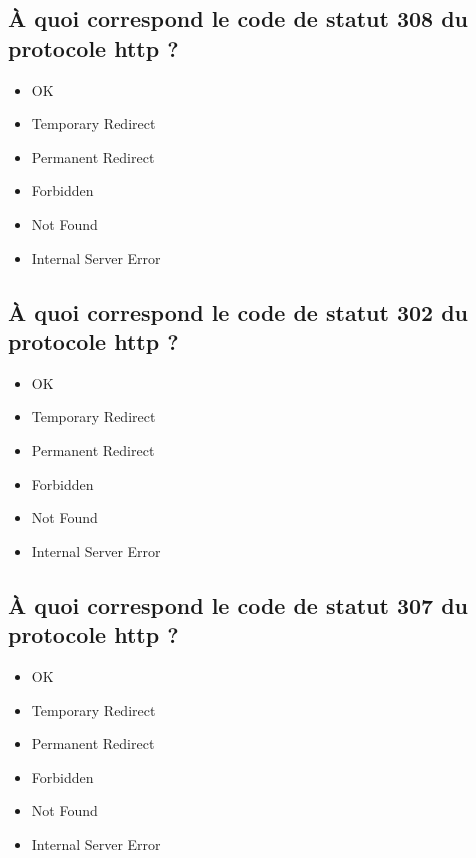 \documentclass[11pt,a4paper]{article}
\begin{document}
\subsection{\`A quoi correspond le code de statut 308 du protocole http ?} %

\begin{itemize}
\item[\CaseCoche] OK\\
\item[\CaseCoche] Temporary Redirect\\  %
\item[\CaseCoche] Permanent Redirect\\
\item[\CaseCoche] Forbidden\\
\item[\CaseCoche] Not Found\\
\item[\CaseCoche] Internal Server Error\\
\end{itemize}

\subsection{\`A quoi correspond le code de statut 302 du protocole http ?} %

\begin{itemize}
\item[\CaseCoche] OK\\
\item[\CaseCoche] Temporary Redirect\\
\item[\CaseCoche] Permanent Redirect\\  %
\item[\CaseCoche] Forbidden\\
\item[\CaseCoche] Not Found\\
\item[\CaseCoche] Internal Server Error\\
\end{itemize}


\subsection{\`A quoi correspond le code de statut 307 du protocole http ?} %

\begin{itemize}
\item[\CaseCoche] OK\\
\item[\CaseCoche] Temporary Redirect\\
\item[\CaseCoche] Permanent Redirect\\  %
\item[\CaseCoche] Forbidden\\
\item[\CaseCoche] Not Found\\
\item[\CaseCoche] Internal Server Error\\
\end{itemize}
\end{document}
